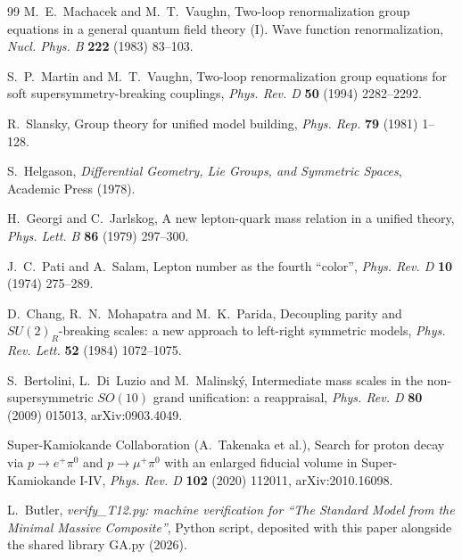 \documentclass[11pt]{article}
\theoremstyle{definition}
\begin{document}
\begin{thebibliography}{99}
M.~E.~Machacek and M.~T.~Vaughn,
Two-loop renormalization group equations in a general quantum field theory (I). Wave function renormalization,
\emph{Nucl. Phys. B} \textbf{222} (1983) 83--103.

S.~P.~Martin and M.~T.~Vaughn,
Two-loop renormalization group equations for soft supersymmetry-breaking couplings,
\emph{Phys. Rev. D} \textbf{50} (1994) 2282--2292.

R.~Slansky,
Group theory for unified model building,
\emph{Phys. Rep.} \textbf{79} (1981) 1--128.

S.~Helgason,
\emph{Differential Geometry, Lie Groups, and Symmetric Spaces},
Academic Press (1978).

H.~Georgi and C.~Jarlskog,
A new lepton-quark mass relation in a unified theory,
\emph{Phys. Lett. B} \textbf{86} (1979) 297--300.

J.~C.~Pati and A.~Salam,
Lepton number as the fourth ``color'',
\emph{Phys. Rev. D} \textbf{10} (1974) 275--289.

D.~Chang, R.~N.~Mohapatra and M.~K.~Parida,
Decoupling parity and $SU(2)_{R}$-breaking scales: a new approach to left-right symmetric models,
\emph{Phys. Rev. Lett.} \textbf{52} (1984) 1072--1075.

S.~Bertolini, L.~Di~Luzio and M.~Malinsk\'y,
Intermediate mass scales in the non-supersymmetric $SO(10)$ grand unification: a reappraisal,
\emph{Phys. Rev. D} \textbf{80} (2009) 015013, arXiv:0903.4049.

Super-Kamiokande Collaboration (A.~Takenaka et al.),
Search for proton decay via $p \to e^{+}\pi^{0}$ and $p \to \mu^{+}\pi^{0}$ with an enlarged fiducial volume in Super-Kamiokande I-IV,
\emph{Phys. Rev. D} \textbf{102} (2020) 112011, arXiv:2010.16098.

L.~Butler,
\emph{verify\_T12.py: machine verification for ``The Standard Model from the Minimal Massive Composite''},
Python script, deposited with this paper alongside the shared library GA.py (2026).

\end{thebibliography}
\end{document}
